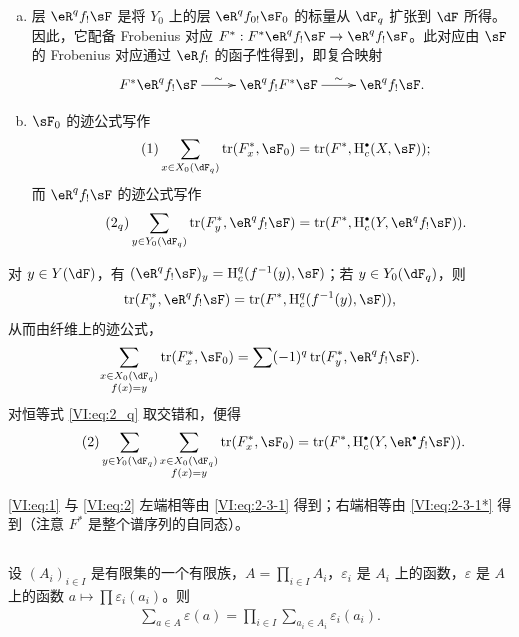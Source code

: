 \begin{enumerate}[a)]
  \item 层 $\eR^q f_! \sF$ 是将 $Y_0$ 上的层 $\eR^q f_{0!} \sF_0$ 的标量从 $\dF_q$ 扩张到 $\dF$ 所得。因此，它配备 Frobenius 对应 $F^\ast:F^\ast\eR^q f_! \sF \to \eR^q f_! \sF$。此对应由 $\sF$ 的 Frobenius 对应通过 $\eR f_!$ 的函子性得到，即复合映射
    \[\xymatrix{
      F^\ast \eR^q f_! \sF \ar[r]^-\sim
        & \eR^q f_! F^\ast \sF \ar[r]^-\sim
        & \eR^q f_! \sF \text{.}
    }\]
  \item $\sF_0$ 的迹公式写作
    \begin{align*}\tag{1}\label{VI:eq:1}
      \sum_{x\in X_0(\dF_q)} \tr(F_x^\ast,\sF_0) = \tr(F^\ast,\h_c^\bullet(X,\sF)) \text{;}
    \end{align*}
    而 $\eR^q f_! \sF$ 的迹公式写作
    \begin{align*}\tag{2$_q$}\label{VI:eq:2_q}
      \sum_{y\in Y_0(\dF_q)} \tr(F_y^\ast,\eR^q f_! \sF) = \tr(F^\ast, \h_c^\bullet(Y,\eR^q f_! \sF)) \text{.}
    \end{align*}
\end{enumerate}

对 $y\in Y(\dF)$，有 $(\eR^q f_! \sF)_y = \h_c^q(f^{-1}(y),\sF)$；若 $y\in Y_0(\dF_q)$，则
\[
  \tr(F_y^\ast,\eR^q f_! \sF) = \tr(F^\ast,\h_c^q(f^{-1}(y),\sF)) \text{,}
\]
从而由纤维上的迹公式，
\[
  \sum_{\substack{x\in X_0(\dF_q) \\ f(x) = y}} \tr(F_x^\ast,\sF_0) = \sum (-1)^q \tr(F_y^\ast,\eR^q f_! \sF) \text{.}
\]
对恒等式 \eqref{VI:eq:2_q} 取交错和，便得
\begin{align*}\tag{2}\label{VI:eq:2}
  \sum_{y\in Y_0(\dF_q)} \sum_{\substack{x \in X_0(\dF_q) \\ f(x) = y}} \tr(F_x^\ast,\sF_0) = \tr(F^\ast,\h_c^\bullet(Y,\eR^\bullet f_! \sF)) \text{.}
\end{align*}

\eqref{VI:eq:1} 与 \eqref{VI:eq:2} 左端相等由 \eqref{VI:eq:2-3-1} 得到；右端相等由 \eqref{VI:eq:2-3-1*} 得到（注意 $F^\ast$ 是整个谱序列的自同态）。

\subsection{}\label{VI:2-4}

设 $(A_i)_{i\in I}$ 是有限集的一个有限族，$A=\prod_{i\in I} A_i$，$\varepsilon_i$ 是 $A_i$ 上的函数，$\varepsilon$ 是 $A$ 上的函数 $a\mapsto \prod \varepsilon_i(a_i)$。则
\begin{align*}\tag{2.4.1}\label{VI:eq:2-4-1}
  \sum_{a\in A} \varepsilon(a) = \prod_{i\in I} \sum_{a_i\in A_i} \varepsilon_i(a_i) \text{.}
\end{align*}

